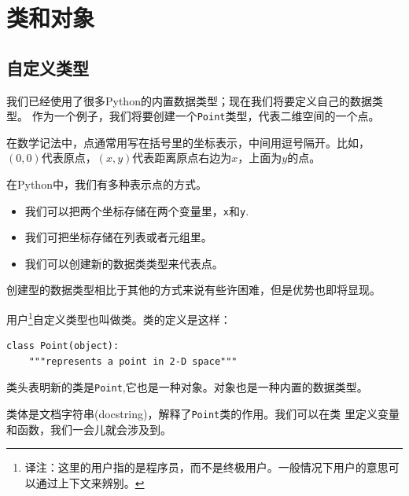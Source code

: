 \chapter{类和对象}

\section{自定义类型}
\label{point}


我们已经使用了很多Python的内置数据类型；现在我们将要定义自己的数据类型。
作为一个例子，我们将要创建一个{\tt Point}类型，代表二维空间的一个点。


在数学记法中，点通常用写在括号里的坐标表示，中间用逗号隔开。比如，
$(0,0)$代表原点，$(x,y)$代表距离原点右边为$x$，上面为$y$的点。


在Python中，我们有多种表示点的方式。

\begin{itemize}

\item 我们可以把两个坐标存储在两个变量里，{\tt x}和{\tt y}.

\item 我们可把坐标存储在列表或者元组里。

\item 我们可以创建新的数据类类型来代表点。

\end{itemize}


创建型的数据类型相比于其他的方式来说有些许困难，但是优势也即将显现。

用户\footnote{译注：这里的用户指的是程序员，而不是终极用户。一般情况下用户的意思可以通过上下文来辨别。}自定义类型也叫做类。类的定义是这样：

\beforeverb
\begin{verbatim}
class Point(object):
    """represents a point in 2-D space"""
\end{verbatim}
\afterverb
%

类头表明新的类是{\tt Point},它也是一种对象。对象也是一种内置的数据类型。


类体是文档字符串(docstring)，解释了{\tt Point}类的作用。我们可以在类
里定义变量和函数，我们一会儿就会涉及到。

